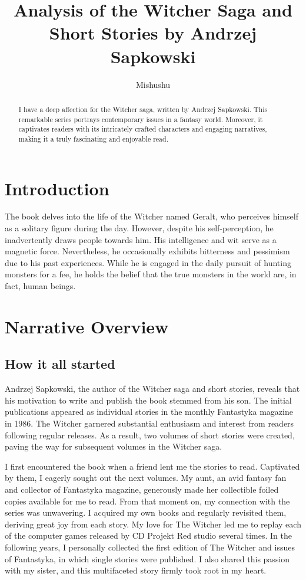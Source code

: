 \documentclass{article}
\title{Analysis of the Witcher Saga and Short Stories by Andrzej Sapkowski}
\author{Mishushu}
\begin{document}
\maketitle

\begin{abstract}
I have a deep affection for the Witcher saga, written by Andrzej Sapkowski. This remarkable series portrays contemporary issues in a fantasy world. Moreover, it captivates readers with its intricately crafted characters and engaging narratives, making it a truly fascinating and enjoyable read.
\end{abstract}

\section{Introduction}

The book delves into the life of the Witcher named Geralt, who perceives himself as a solitary figure during the day. However, despite his self-perception, he inadvertently draws people towards him. His intelligence and wit serve as a magnetic force. Nevertheless, he occasionally exhibits bitterness and pessimism due to his past experiences. While he is engaged in the daily pursuit of hunting monsters for a fee, he holds the belief that the true monsters in the world are, in fact, human beings.

\section{Narrative Overview}

\subsection{How it all started}

Andrzej Sapkowski, the author of the Witcher saga and short stories, reveals that his motivation to write and publish the book stemmed from his son. The initial publications appeared as individual stories in the monthly Fantastyka magazine in 1986. The Witcher garnered substantial enthusiasm and interest from readers following regular releases. As a result, two volumes of short stories were created, paving the way for subsequent volumes in the Witcher saga.

I first encountered the book when a friend lent me the stories to read. Captivated by them, I eagerly sought out the next volumes. My aunt, an avid fantasy fan and collector of Fantastyka magazine, generously made her collectible foiled copies available for me to read. From that moment on, my connection with the series was unwavering. I acquired my own books and regularly revisited them, deriving great joy from each story. My love for The Witcher led me to replay each of the computer games released by CD Projekt Red studio several times. In the following years, I personally collected the first edition of The Witcher and issues of Fantastyka, in which single stories were published. I also shared this passion with my sister, and this multifaceted story firmly took root in my heart.
\end{document}
